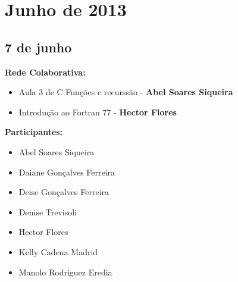 \documentclass[12pt]{article}
\begin{document}
\section{Junho de 2013}

\subsection{7 de junho}

{\bf Rede Colaborativa:}

\begin{itemize}

\item  Aula 3 de C Fun\c{c}\~oes e recurss\~ao -  {\bf Abel Soares Siqueira}

\item Introdu\c{c}\~ao ao Fortran 77 - {\bf Hector Flores}


\end{itemize}

{\bf{Participantes:}}

\begin{itemize}
\item Abel Soares Siqueira
\item Daiane Gon\c{c}alves Ferreira
\item Deise Gon\c{c}alves Ferreira
\item Denise Trevisoli
\item Hector Flores
\item Kelly Cadena Madrid
\item Manolo Rodriguez Eredia
\end{itemize}
\end{document}
